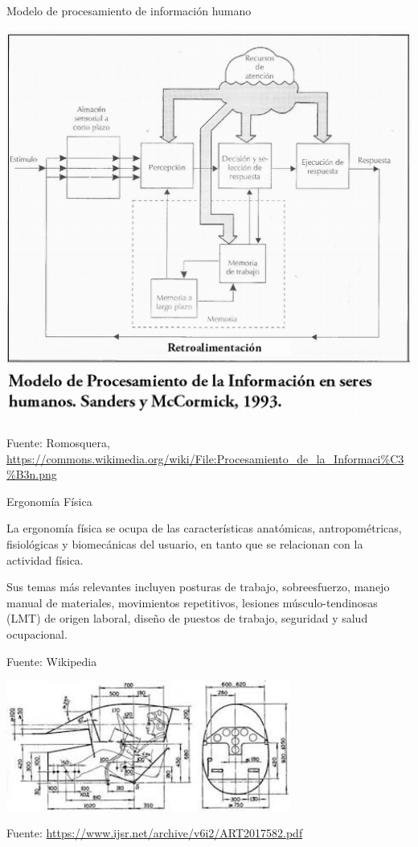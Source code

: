    
\begin{frame}{Modelo de procesamiento de informaci\'on humano}

  \includegraphics[width=0.6\linewidth]{imagenes/1.1.introduccion/modelo_procesamiento_informacion.png}

{\tiny Fuente: Romosquera, \url{https://commons.wikimedia.org/wiki/File:Procesamiento_de_la_Informaci\%C3\%B3n.png}
\\ \cite{mark1993human} }

\end{frame}

\begin{frame}{Ergonom\'ia F\'isica}
  
La ergonom\'ia f\'isica se ocupa de las caracter\'isticas anat\'omicas, antropom\'etricas, fisiol\'ogicas y biomec\'anicas del usuario, en tanto que se relacionan con la actividad f\'isica.

Sus temas m\'as relevantes incluyen posturas de trabajo, sobreesfuerzo, manejo manual de materiales, movimientos repetitivos, lesiones m\'usculo-tendinosas (LMT) de origen laboral, dise\~no de puestos de trabajo, seguridad y salud ocupacional. 

{\tiny Fuente: Wikipedia}


\begin{center}
  \includegraphics[width=0.7\textwidth]{imagenes/1.1.introduccion/ergonomia_fisica.jpeg}
\end{center}
{\tiny Fuente: \url{https://www.ijsr.net/archive/v6i2/ART2017582.pdf}}


\end{frame}

